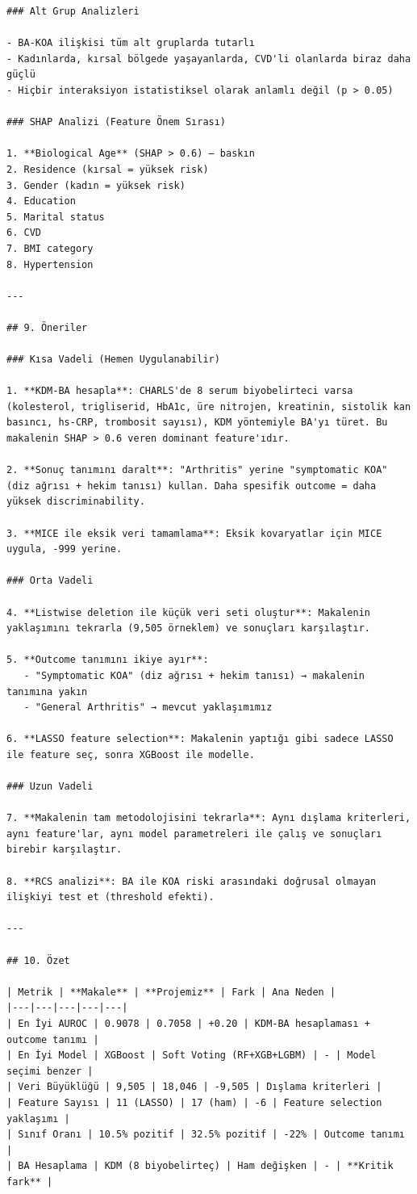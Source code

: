 ﻿\documentclass[11pt,a4paper]{article}
\begin{document}
\begin{verbatim}
### Alt Grup Analizleri

- BA-KOA ilişkisi tüm alt gruplarda tutarlı
- Kadınlarda, kırsal bölgede yaşayanlarda, CVD'li olanlarda biraz daha güçlü
- Hiçbir interaksiyon istatistiksel olarak anlamlı değil (p > 0.05)

### SHAP Analizi (Feature Önem Sırası)

1. **Biological Age** (SHAP > 0.6) — baskın
2. Residence (kırsal = yüksek risk)
3. Gender (kadın = yüksek risk)
4. Education
5. Marital status
6. CVD
7. BMI category
8. Hypertension

---

## 9. Öneriler

### Kısa Vadeli (Hemen Uygulanabilir)

1. **KDM-BA hesapla**: CHARLS'de 8 serum biyobelirteci varsa (kolesterol, trigliserid, HbA1c, üre nitrojen, kreatinin, sistolik kan basıncı, hs-CRP, trombosit sayısı), KDM yöntemiyle BA'yı türet. Bu makalenin SHAP > 0.6 veren dominant feature'ıdır.

2. **Sonuç tanımını daralt**: "Arthritis" yerine "symptomatic KOA" (diz ağrısı + hekim tanısı) kullan. Daha spesifik outcome = daha yüksek discriminability.

3. **MICE ile eksik veri tamamlama**: Eksik kovaryatlar için MICE uygula, -999 yerine.

### Orta Vadeli

4. **Listwise deletion ile küçük veri seti oluştur**: Makalenin yaklaşımını tekrarla (9,505 örneklem) ve sonuçları karşılaştır.

5. **Outcome tanımını ikiye ayır**: 
   - "Symptomatic KOA" (diz ağrısı + hekim tanısı) → makalenin tanımına yakın
   - "General Arthritis" → mevcut yaklaşımımız

6. **LASSO feature selection**: Makalenin yaptığı gibi sadece LASSO ile feature seç, sonra XGBoost ile modelle.

### Uzun Vadeli

7. **Makalenin tam metodolojisini tekrarla**: Aynı dışlama kriterleri, aynı feature'lar, aynı model parametreleri ile çalış ve sonuçları birebir karşılaştır.

8. **RCS analizi**: BA ile KOA riski arasındaki doğrusal olmayan ilişkiyi test et (threshold efekti).

---

## 10. Özet

| Metrik | **Makale** | **Projemiz** | Fark | Ana Neden |
|---|---|---|---|---|
| En İyi AUROC | 0.9078 | 0.7058 | +0.20 | KDM-BA hesaplaması + outcome tanımı |
| En İyi Model | XGBoost | Soft Voting (RF+XGB+LGBM) | - | Model seçimi benzer |
| Veri Büyüklüğü | 9,505 | 18,046 | -9,505 | Dışlama kriterleri |
| Feature Sayısı | 11 (LASSO) | 17 (ham) | -6 | Feature selection yaklaşımı |
| Sınıf Oranı | 10.5% pozitif | 32.5% pozitif | -22% | Outcome tanımı |
| BA Hesaplama | KDM (8 biyobelirteç) | Ham değişken | - | **Kritik fark** |


\end{verbatim}
\end{document}

